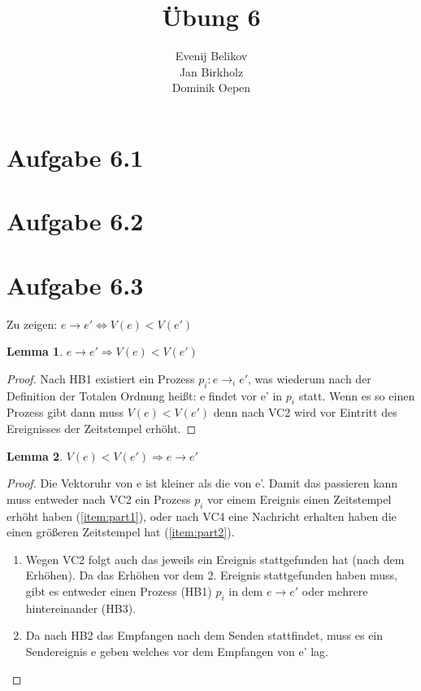 \documentclass{scrartcl}
\newtheorem{lem}{Lemma}
\begin{document}
\title{Übung 6}
\author{Evenij Belikov\\Jan Birkholz\\Dominik Oepen}
\maketitle

\section*{Aufgabe 6.1}

\section*{Aufgabe 6.2}


\section*{Aufgabe 6.3}
Zu zeigen: $ e \rightarrow e' \Longleftrightarrow  V(e) < V(e') $

\begin{lem}\label{lem:1}
$ e \rightarrow e' \Longrightarrow  V(e) < V(e') $
\end{lem}

\begin{proof}
Nach HB1 existiert ein Prozess $ p_{i}: e \rightarrow_{i} e' $, was wiederum nach der Definition der Totalen Ordnung heißt: e findet vor e' in $ p_{i} $ statt.
Wenn es so einen Prozess gibt dann muss $V(e) < V(e')$ denn nach VC2 wird vor Eintritt des Ereignisses der Zeitstempel erhöht.
\end{proof}

\begin{lem}\label{lem:2}
$V(e) < V(e') \Longrightarrow e \rightarrow e' $
\end{lem}

\begin{proof}
Die Vektoruhr von e ist kleiner als die von e'. Damit das passieren kann muss entweder nach VC2 ein Prozess $p_{i}$ vor einem Ereignis einen Zeitstempel erhöht haben (\ref{item:part1}), oder nach VC4 eine Nachricht erhalten haben die einen größeren Zeitstempel hat (\ref{item:part2}).
\begin{enumerate}
\item \label{item:part1} Wegen VC2 folgt auch das jeweils ein Ereignis stattgefunden hat (nach dem Erhöhen). Da das Erhöhen vor dem 2. Ereignis stattgefunden haben muss, gibt es entweder einen Prozess (HB1) $p_{i}$ in dem $e \rightarrow e'$ oder mehrere hintereinander (HB3).
\item \label{item:part2} Da nach HB2 das Empfangen nach dem Senden stattfindet, muss es ein Sendereignis e geben welches vor dem Empfangen von e' lag.
\end{enumerate}
\end{proof}
\end{document}
